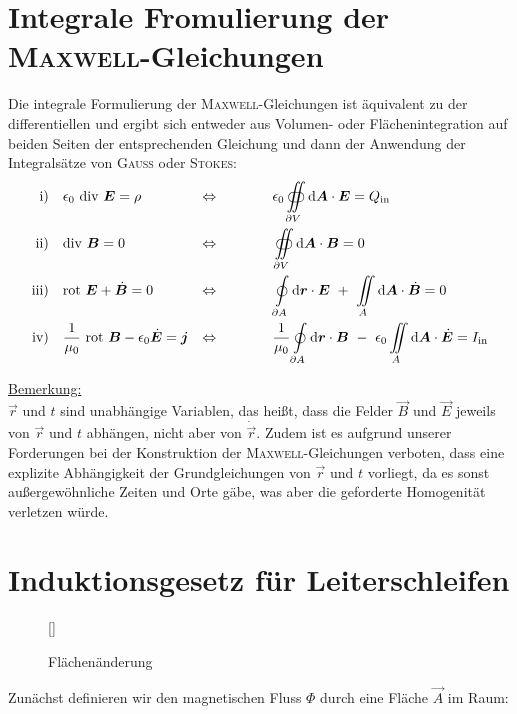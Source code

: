 \section{Integrale Fromulierung der \textsc{Maxwell}-Gleichungen}
Die integrale Formulierung der \textsc{Maxwell}-Gleichungen ist äquivalent zu der differentiellen und ergibt sich entweder aus Volumen- oder Flächenintegration auf beiden Seiten der entsprechenden Gleichung und dann der Anwendung der Integralsätze von \textsc{Gauss} oder \textsc{Stokes}:
\ \\
\begin{align*}
\text{i)} \quad & \epsilon_0 \ \div \vec{E} = \rho & \Leftrightarrow \qquad\qquad & \epsilon_0\oiint\limits_{\partial V} \mathrm{d}\vec{A} \cdot\vec{E} = Q_{\text{in}} \\
\text{ii)} \quad & \div\vec{B} = 0 & \Leftrightarrow \qquad\qquad & \oiint\limits_{\partial V} \mathrm{d}\vec{A}\cdot\vec{B} = 0 \\
\text{iii)} \quad & \rot \vec{E} + \dot{\vec{B}} = 0 & \Leftrightarrow \qquad\qquad & \oint\limits_{\partial A} \mathrm{d}\vec{r}\cdot\vec{E} \ + \ \iint\limits_A \mathrm{d}\vec{A}\cdot\dot{\vec{B}} = 0 \\
\text{iv)} \quad & \frac{1}{\mu_0} \ \rot \vec{B} - \epsilon_0 \dot{\vec{E}} = \vec{j} & \Leftrightarrow \qquad\qquad & \frac{1}{\mu_0}\oint\limits_{\partial A}\mathrm{d}\vec{r}\cdot\vec{B} \ - \ \epsilon_0\iint\limits_A\mathrm{d}\vec{A}\cdot\dot{\vec{E}} = I_{\text{in}}
\end{align*}

\underline{Bemerkung:}\\

$\vec{r}$ und $t$ sind unabhängige Variablen, das heißt, dass die Felder $\vec{B}$ und $\vec{E}$ jeweils von $\vec{r}$ und $t$ abhängen, nicht aber von $\dot{\vec{r}}$.
Zudem ist es aufgrund unserer Forderungen bei der Konstruktion der \textsc{Maxwell}-Gleichungen verboten, dass eine explizite Abhängigkeit der Grundgleichungen von $\vec{r}$ und $t$ vorliegt, da es sonst außergewöhnliche Zeiten und Orte gäbe, was aber die geforderte Homogenität verletzen würde.

\section{Induktionsgesetz für Leiterschleifen}

\begin{wrapfigure}[]{l}[0cm]{0cm}
	\raisebox{0pt}[\dimexpr{}\baselineskip\relax]{
		\colorbox{hgrey}{
		}
	}
	\caption{Flächenänderung}
\end{wrapfigure}
Zunächst definieren wir den magnetischen Fluss $\Phi$ durch eine Fläche $\vec{A}$ im Raum:

